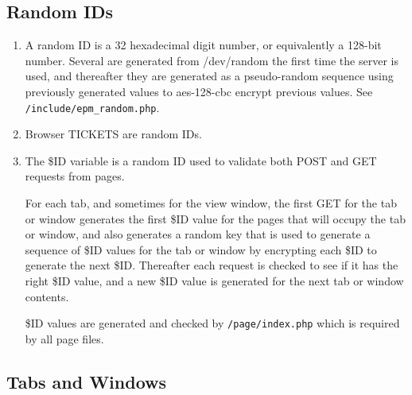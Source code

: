 \documentclass[12pt]{article}
\begin{document}
\subsection{Random IDs}

\begin{enumerate}
\item A random ID is a 32 hexadecimal digit number, or equivalently
      a 128-bit number.  Several are generated from /dev/random
      the first time the server is used, and thereafter they
      are generated as a pseudo-random sequence using previously
      generated values to aes-128-cbc encrypt previous values.
      See {\tt /include/epm\_random.php}.
\item Browser TICKETS are random IDs.
\item The \$ID variable is a random ID used to validate
      both POST and GET requests from pages.
      
      For each tab, and
      sometimes for the view window, the first GET for the tab
      or window generates the first \$ID value for the pages
      that will occupy the tab or window, and also generates
      a random key that is used to generate a sequence
      of \$ID values for the tab or window by encrypting
      each \$ID to generate the next \$ID.  Thereafter each
      request is checked to see if it has the right \$ID value,
      and a new \$ID value is generated for the next tab or
      window contents.

      \$ID values are generated and checked by {\tt /page/index.php}
      which is required by all page files.
\end{enumerate}

\subsection{Tabs and Windows}
\end{document}

